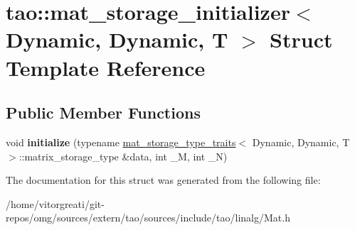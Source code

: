 \hypertarget{structtao_1_1mat__storage__initializer_3_01_dynamic_00_01_dynamic_00_01_t_01_4}{}\section{tao\+::mat\+\_\+storage\+\_\+initializer$<$ Dynamic, Dynamic, T $>$ Struct Template Reference}
\label{structtao_1_1mat__storage__initializer_3_01_dynamic_00_01_dynamic_00_01_t_01_4}
\subsection*{Public Member Functions}
\begin{DoxyCompactItemize}
\item 
\mbox{\label{structtao_1_1mat__storage__initializer_3_01_dynamic_00_01_dynamic_00_01_t_01_4_ad489e0057e227b0fc2f73378bfcfea24}} 
void {\bfseries initialize} (typename \mbox{\hyperlink{structtao_1_1mat__storage__type__traits}{mat\+\_\+storage\+\_\+type\+\_\+traits}}$<$ Dynamic, Dynamic, T $>$\+::matrix\+\_\+storage\+\_\+type \&data, int \+\_\+M, int \+\_\+N)
\end{DoxyCompactItemize}


The documentation for this struct was generated from the following file\+:\begin{DoxyCompactItemize}
\item 
/home/vitorgreati/git-\/repos/omg/sources/extern/tao/sources/include/tao/linalg/Mat.\+h\end{DoxyCompactItemize}
